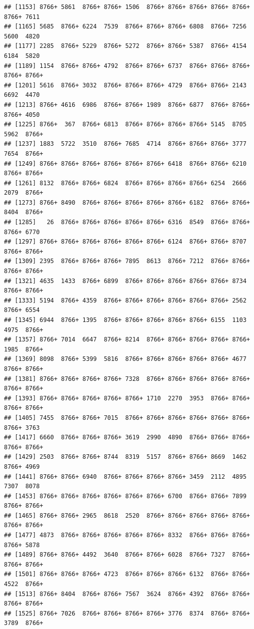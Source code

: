 \documentclass[
]{book}
\begin{document}
\begin{verbatim}
## [1153] 8766+ 5861  8766+ 8766+ 1506  8766+ 8766+ 8766+ 8766+ 8766+ 8766+ 7611 
## [1165] 5685  8766+ 6224  7539  8766+ 8766+ 8766+ 6808  8766+ 7256  5600  4820 
## [1177] 2285  8766+ 5229  8766+ 5272  8766+ 8766+ 5387  8766+ 4154  6184  5820 
## [1189] 1154  8766+ 8766+ 4792  8766+ 8766+ 6737  8766+ 8766+ 8766+ 8766+ 8766+
## [1201] 5616  8766+ 3032  8766+ 8766+ 8766+ 4729  8766+ 8766+ 2143  6692  4470 
## [1213] 8766+ 4616  6986  8766+ 8766+ 1989  8766+ 6877  8766+ 8766+ 8766+ 4050 
## [1225] 8766+  367  8766+ 6813  8766+ 8766+ 8766+ 8766+ 5145  8705  5962  8766+
## [1237] 1883  5722  3510  8766+ 7685  4714  8766+ 8766+ 8766+ 3777  7654  8766+
## [1249] 8766+ 8766+ 8766+ 8766+ 8766+ 8766+ 6418  8766+ 8766+ 6210  8766+ 8766+
## [1261] 8132  8766+ 8766+ 6824  8766+ 8766+ 8766+ 8766+ 6254  2666  2079  8766+
## [1273] 8766+ 8490  8766+ 8766+ 8766+ 8766+ 8766+ 6182  8766+ 8766+ 8404  8766+
## [1285]   26  8766+ 8766+ 8766+ 8766+ 8766+ 6316  8549  8766+ 8766+ 8766+ 6770 
## [1297] 8766+ 8766+ 8766+ 8766+ 8766+ 8766+ 6124  8766+ 8766+ 8707  8766+ 8766+
## [1309] 2395  8766+ 8766+ 8766+ 7895  8613  8766+ 7212  8766+ 8766+ 8766+ 8766+
## [1321] 4635  1433  8766+ 6899  8766+ 8766+ 8766+ 8766+ 8766+ 8734  8766+ 8766+
## [1333] 5194  8766+ 4359  8766+ 8766+ 8766+ 8766+ 8766+ 8766+ 2562  8766+ 6554 
## [1345] 6944  8766+ 1395  8766+ 8766+ 8766+ 8766+ 8766+ 6155  1103  4975  8766+
## [1357] 8766+ 7014  6647  8766+ 8214  8766+ 8766+ 8766+ 8766+ 8766+ 1985  8766+
## [1369] 8098  8766+ 5399  5816  8766+ 8766+ 8766+ 8766+ 8766+ 4677  8766+ 8766+
## [1381] 8766+ 8766+ 8766+ 8766+ 7328  8766+ 8766+ 8766+ 8766+ 8766+ 8766+ 8766+
## [1393] 8766+ 8766+ 8766+ 8766+ 8766+ 1710  2270  3953  8766+ 8766+ 8766+ 8766+
## [1405] 7455  8766+ 8766+ 7015  8766+ 8766+ 8766+ 8766+ 8766+ 8766+ 8766+ 3763 
## [1417] 6660  8766+ 8766+ 8766+ 3619  2990  4890  8766+ 8766+ 8766+ 8766+ 8766+
## [1429] 2503  8766+ 8766+ 8744  8319  5157  8766+ 8766+ 8669  1462  8766+ 4969 
## [1441] 8766+ 8766+ 6940  8766+ 8766+ 8766+ 8766+ 3459  2112  4895  7307  8078 
## [1453] 8766+ 8766+ 8766+ 8766+ 8766+ 8766+ 6700  8766+ 8766+ 7899  8766+ 8766+
## [1465] 8766+ 8766+ 2965  8618  2520  8766+ 8766+ 8766+ 8766+ 8766+ 8766+ 8766+
## [1477] 4873  8766+ 8766+ 8766+ 8766+ 8766+ 8332  8766+ 8766+ 8766+ 8766+ 5878 
## [1489] 8766+ 8766+ 4492  3640  8766+ 8766+ 6028  8766+ 7327  8766+ 8766+ 8766+
## [1501] 8766+ 8766+ 8766+ 4723  8766+ 8766+ 8766+ 6132  8766+ 8766+ 4522  8766+
## [1513] 8766+ 8404  8766+ 8766+ 7567  3624  8766+ 4392  8766+ 8766+ 8766+ 8766+
## [1525] 8766+ 7026  8766+ 8766+ 8766+ 8766+ 3776  8374  8766+ 8766+ 3789  8766+

\end{verbatim}
\end{document}
